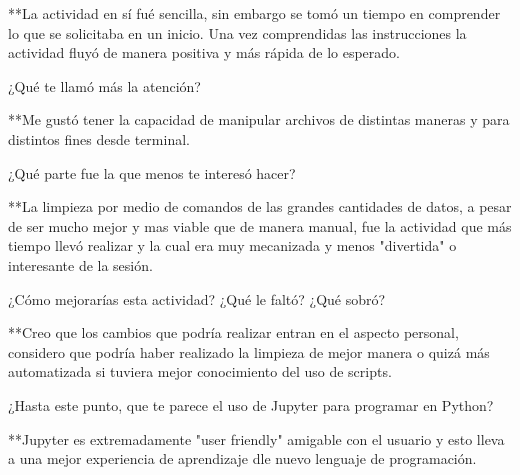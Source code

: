 \documentclass{article} %
\begin{document}
**La actividad en sí fué sencilla, sin embargo se tomó un tiempo en comprender lo que se solicitaba en un inicio. Una vez comprendidas las instrucciones la actividad fluyó de manera positiva y más rápida de lo esperado. 

\vspace{0.5 cm}

¿Qué te llamó más la atención?

\vspace{0.5 cm}

**Me gustó tener la capacidad de manipular archivos de distintas maneras y para distintos fines desde terminal. 

\vspace{0.5 cm}

¿Qué parte fue la que menos te interesó hacer?

\vspace{0.5 cm}

**La limpieza por medio de comandos de las grandes cantidades de datos, a pesar de ser mucho mejor y mas viable que de manera manual, fue la actividad que más tiempo llevó realizar y la cual era muy mecanizada y menos "divertida" o interesante de la sesión.

\vspace{0.5 cm}

¿Cómo mejorarías esta actividad? ¿Qué le faltó? ¿Qué sobró?

\vspace{0.5 cm}

**Creo que los cambios que podría realizar entran en el aspecto personal, considero que podría haber realizado la limpieza de mejor manera o quizá más automatizada si tuviera mejor conocimiento del uso de scripts. 

\vspace{0.5 cm}

¿Hasta este punto, que te parece el uso de Jupyter para programar en Python? 

\vspace{0.5 cm}

**Jupyter es extremadamente "user friendly" amigable con el usuario y esto lleva a una mejor experiencia de aprendizaje dle nuevo lenguaje de programación.

\vspace{0.5 cm}
\end{document}
